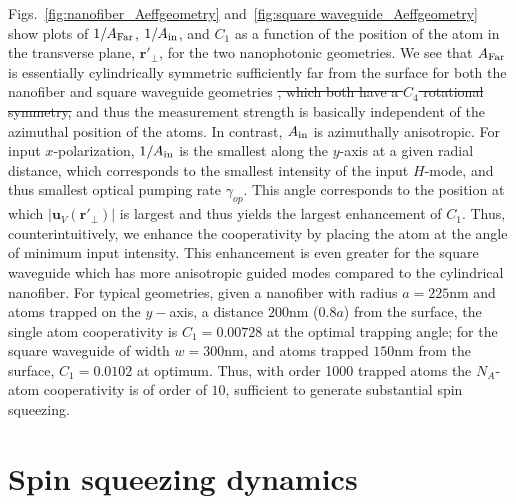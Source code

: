\documentclass[preprint,aps,pra,onecolumn,superscriptaddress]{revtex4-1} %
\newcommand{\mbf}[1]{\mathbf{#1}}
\newcommand{\AF}{A_{\rm Far}} %
\newcommand{\Ai}{A_{\rm in}} %
\begin{document}
Figs.~\ref{fig:nanofiber_Aeffgeometry} and~\ref{fig:square waveguide_Aeffgeometry} show plots of $1/\AF$, $1/\Ai$, and $C_1$ as a function of  the position of the atom in the transverse plane, $\mbf{r}'_\perp$, for the two nanophotonic geometries.  We see that $\AF$ is essentially cylindrically symmetric sufficiently far from the surface for both the nanofiber and square waveguide geometries {\color{red} \sout{, which both have a $ C_4 $ rotational symmetry,}} and thus the measurement strength is basically independent of the azimuthal position of the atoms.  In contrast, $\Ai$ is azimuthally anisotropic.  For input $x$-polarization, $1/\Ai$ is the smallest along the $y$-axis at a given radial distance, which corresponds to the smallest intensity of the input $H$-mode, and thus smallest optical pumping rate $\gamma_{op}$.  This angle corresponds to the position at which $\vert \mbf{u}_V (\mbf{r}'_\perp) \vert$ is largest and thus yields the largest enhancement of $C_1$.  Thus, counterintuitively, we enhance the cooperativity by placing the atom at the angle of minimum input intensity.   This enhancement is even greater for the square waveguide which has more anisotropic guided modes compared to the cylindrical nanofiber.  For typical geometries, given a nanofiber with radius $a = 225$nm and atoms trapped on the $y-$axis, a distance $200$nm ($0.8a$) from the surface, the single atom cooperativity is $C_1 =0.00728$ at the optimal trapping angle; for the square waveguide of width $w =300$nm, and atoms trapped $150$nm from the surface, $C_1 =0.0102$ at optimum.  Thus, with order 1000 trapped atoms the $N_A$-atom cooperativity is of order of $ 10 $, sufficient to generate substantial spin squeezing.

\section{Spin squeezing dynamics}
\end{document}

